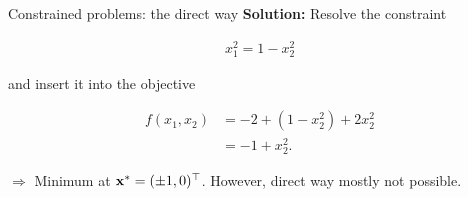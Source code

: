 \documentclass[11pt,compress,t,notes=noshow, xcolor=table]{beamer}
\begin{document}
\begin{vbframe}{Constrained problems: the direct way}
\textbf{Solution:} Resolve the constraint

\vspace{-\baselineskip}

\begin{eqnarray*}
    x_1^2 = 1 - x_2^2
\end{eqnarray*}

and insert it into the objective

\vspace*{-\baselineskip}

\begin{align*}
    f(x_1, x_2) &= -2 + (1 - x_2^2) + 2 x_2^2 \\
    &= -1 + x_2^2.
\end{align*}

$\Rightarrow$ Minimum at $\mathbf{x}^* = (\pm 1, 0)^\top$.
However, direct way mostly not possible.

\end{vbframe}
\end{document}
